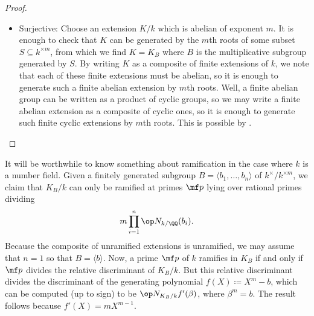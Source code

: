 \documentclass[notes.tex]{subfiles}
\begin{document}
\begin{proof}
\begin{listalph}
\begin{itemize}
			\item Surjective: Choose an extension $K/k$ which is abelian of exponent $m$. It is enough to check that $K$ can be generated by the $m$th roots of some subset $S\subseteq k^{\times m}$, from which we find $K=K_B$ where $B$ is the multiplicative subgroup generated by $S$. By writing $K$ as a composite of finite extensions of $k$, we note that each of these finite extensions must be abelian, so it is enough to generate such a finite abelian extension by $m$th roots. Well, a finite abelian group can be written as a product of cyclic groups, so we may write a finite abelian extension as a composite of cyclic ones, so it is enough to generate such finite cyclic extensions by $m$th roots. This is possible by .
			\qedhere
		\end{itemize}
	\end{listalph}
\end{proof}
\begin{remark} \label{rem:kummer-ramified}
	It will be worthwhile to know something about ramification in the case where $k$ is a number field. Given a finitely generated subgroup $B=\langle b_1,\ldots,b_n\rangle$ of $k^\times/k^{\times m}$, we claim that $K_B/k$ can only be ramified at primes $\mf p$ lying over rational primes dividing
	\[m\prod_{i=1}^n\op N_{k/\QQ}(b_i).\]
	Because the composite of unramified extensions is unramified, we may assume that $n=1$ so that $B=\langle b\rangle$. Now, a prime $\mf p$ of $k$ ramifies in $K_B$ if and only if $\mf p$ divides the relative discriminant of $K_B/k$. But this relative discriminant divides the discriminant of the generating polynomial $f(X)\coloneqq X^m-b$, which can be computed (up to sign) to be $\op N_{K_B/k}f'(\beta)$, where $\beta^m=b$. The result follows because $f'(X)=mX^{m-1}$.
\end{remark}
\end{document}
